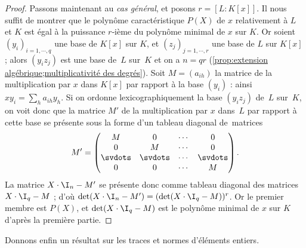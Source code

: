 \documentclass[11pt, %
  title in boldface,
  theorem in new line,
  theorem numbering = section,
  number theorems separately,
  simple name,
]{beaulivre}
\begin{document}
\begin{proof}
        Passons maintenant au \emph{cas général}, et posons \( r = [L:K[x]] \). Il nous suffit de montrer que le polynôme caractéristique \( P(X) \) de \( x \) relativement  à \( L \) et \( K \) est égal à la puissance \( r \)‑ième du polynôme minimal de \( x \) sur \( K \). Or soient \( (y_i)_{i = 1, \cdots, q} \) une base de \( K[x] \) sur \( K \), et \( (z_j)_{j = 1, \cdots, r} \) une base de \( L \) sur \( K[x] \) ; alors \( (y_i z_j) \) est une base de~\( L \) sur~\( K \) et on a \( n = qr \) (\cref{prop:extension algébrique;multiplicativité des degrés}). Soit \( M = (a_{ih}) \) la matrice de la multiplication par \( x \) dans \( K[x] \) par rapport à la base \( (y_i) \) : ainsi \( xy_i = \sum_h a_{ih} y_h \). Si on ordonne lexicographiquement la base \( (y_i z_j) \) de~\( L \) sur~\( K \), on voit donc que la matrice \( M' \) de la multiplication par \( x \) dans~\( L \) par rapport à cette base se présente sous la forme d'un tableau diagonal de~matrices
        \[
            M' =
            \begin{pmatrix}
                M & 0 & \cdots & 0\\
                0 & M & \cdots & 0\\
                \svdots & \svdots & \cdots & \svdots\\
                0 & 0 & \cdots & M
            \end{pmatrix}
            .
        \]
        La matrice \( X \cdot \I_n - M' \) se présente donc comme tableau diagonal des matrices \( X \cdot \I_q - M \) ; d'où \( \det(X \cdot \I_n - M') = (\det(X \cdot \I_q - M))^r \). Or le premier membre est \( P(X) \), et \( \det(X \cdot \I_q - M) \) est le polynôme minimal de \( x \) sur \( K \) d'après la première partie.
    \end{proof}

    \medskip
    Donnons enfin un résultat sur les traces et normes d'éléments entiers.
\end{document}
